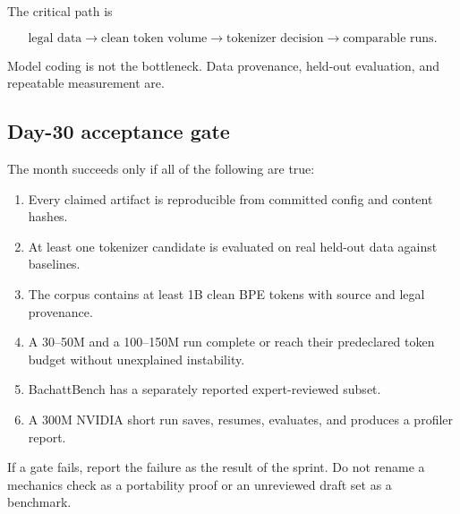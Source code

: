 The critical path is

\[
  \text{legal data}
  \longrightarrow\text{clean token volume}
  \longrightarrow\text{tokenizer decision}
  \longrightarrow\text{comparable runs}.
\]

Model coding is not the bottleneck. Data provenance, held-out evaluation, and
repeatable measurement are.

\subsection{Day-30 acceptance gate}

The month succeeds only if all of the following are true:

\begin{enumerate}
  \setlength{\itemsep}{0pt}
  \item Every claimed artifact is reproducible from committed config and content hashes.
  \item At least one tokenizer candidate is evaluated on real held-out data against baselines.
  \item The corpus contains at least 1B clean BPE tokens with source and legal provenance.
  \item A 30--50M and a 100--150M run complete or reach their predeclared token budget without unexplained instability.
  \item BachattBench has a separately reported expert-reviewed subset.
  \item A 300M NVIDIA short run saves, resumes, evaluates, and produces a profiler report.
\end{enumerate}

If a gate fails, report the failure as the result of the sprint. Do not rename a
mechanics check as a portability proof or an unreviewed draft set as a benchmark.

